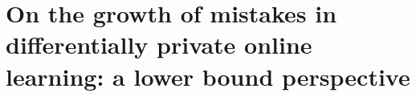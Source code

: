\chapter[Lower bounds for private online learning]{On the growth of mistakes in differentially private online learning: a lower bound perspective}




